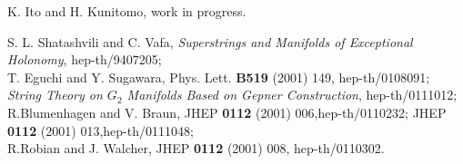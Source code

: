 \documentclass[a4paper,12pt]{article}
\begin{document}
\begin{thebibliography}{99}
K. Ito and H. Kunitomo, work in progress.

 S. L. Shatashvili and C. Vafa, 
{\it Superstrings and Manifolds of Exceptional Holonomy},
	hep-th/9407205;\\
T. Eguchi and Y. Sugawara, Phys. Lett. {\bf B519} (2001) 149,
	hep-th/0108091; {\it String Theory on $G_{2}$ Manifolds Based on
	Gepner Construction}, hep-th/0111012;\\
R.Blumenhagen and V. Braun, JHEP {\bf 0112} (2001) 006,hep-th/0110232;
JHEP {\bf 0112} (2001) 013,hep-th/0111048;\\
R.Robian and J. Walcher, JHEP {\bf 0112} (2001) 008, hep-th/0110302.



\end{thebibliography}
\end{document}
